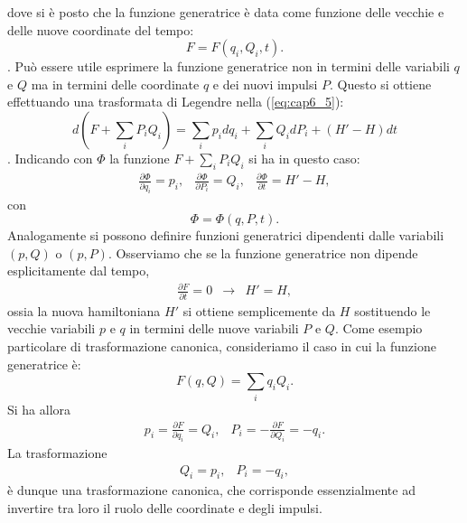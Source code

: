 \documentclass[a4paper,12pt,oneside]{book}
\begin{document}
dove si \`e posto che la funzione generatrice \`e data come funzione delle vecchie e delle nuove coordinate del tempo:
\begin{equation}
F = F(q_i, Q_i,t) .
\end{equation}.
Pu\`o essere utile esprimere la funzione generatrice non in termini delle variabili $q$ e $Q$ ma in termini delle coordinate $q$ e dei nuovi impulsi $P$. Questo si ottiene effettuando una trasformata di Legendre nella (\ref{eq:cap6_5}):
\begin{equation}
d(F+\sum_i P_iQ_i) = \sum_i p_i dq_i + \sum_i Q_i dP_i + (H'-H)dt
\end{equation}.
Indicando con $\Phi$ la funzione $F+\sum_iP_i Q_i $ si ha in questo caso:
\begin{equation}
\begin{matrix}
\frac{\partial \Phi}{\partial q_i} = p_i , & \frac{\partial \Phi}{\partial P_i} = Q_i , & \frac{\partial \Phi}{\partial t} = H'- H ,
\end{matrix}
\label{eq:cap6_6}
\end{equation}
con
\begin{equation}
\Phi = \Phi (q,P,t) .
\end{equation}
Analogamente si possono definire funzioni generatrici dipendenti dalle variabili $(p,Q)$ o $(p,P)$.
Osserviamo che se la funzione generatrice non dipende esplicitamente dal tempo,
\begin{equation}
\begin{matrix}
\frac{\partial F}{\partial t} = 0 & \rightarrow & H' = H ,
\end{matrix}
\end{equation}
ossia la nuova hamiltoniana $H'$ si ottiene semplicemente da $H$ sostituendo le vecchie variabili $p$ e $q$ in termini delle nuove variabili $P$ e $Q$.
Come esempio particolare di trasformazione canonica, consideriamo il caso in cui la funzione generatrice \`e:
\begin{equation}
F(q,Q) = \sum_i q_i Q_i .
\end{equation}
Si ha allora
\begin{equation}
\begin{matrix}
p_i = \frac{\partial F}{\partial q_i} = Q_i , & P_i = - \frac{\partial F}{\partial Q_i} = -q_i .
\end{matrix}
\end{equation}
La trasformazione
\begin{equation}
\begin{matrix}
Q_i = p_i  , & P_i = -q_i ,
\end{matrix}
\end{equation}
\`e dunque una trasformazione canonica, che corrisponde essenzialmente ad invertire tra loro il ruolo delle coordinate e degli impulsi.
\end{document}
